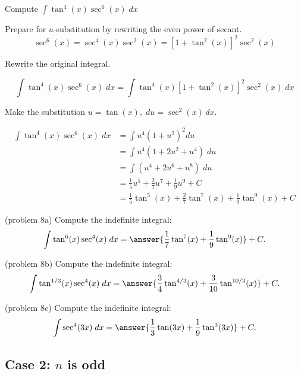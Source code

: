\documentclass{ximera}
\begin{document}
\begin{example}[example 8]
Compute $\displaystyle{\int \tan^4(x) \sec^6(x)\;dx}$

Prepare for $u$-substitution by rewriting the even power of secant.
\[
\sec^6(x) = \sec^4(x) \sec^2(x) = \left[1+\tan^2(x)\right]^2 \sec^2(x)
\]

Rewrite the original integral.

\[
\int \tan^4(x) \sec^6(x)\;dx = \int \tan^4(x) \left[1+\tan^2(x)\right]^2 \sec^2(x) \; dx
\]

Make the substitution $u = \tan(x), \; du = \sec^2(x) \, dx$.


\begin{align*}
\int \tan^4(x) \sec^6(x)\;dx &= \int u^4 (1+u^2)^2 du\\
&= \int u^4(1+2u^2 + u^4) \; du \\
&= \int (u^4 + 2u^6 + u^8) \; du \\
&=  \tfrac15 u^5 + \tfrac27 u^7 + \tfrac19 u^9 + C  \\
&= \tfrac15\tan^5(x)  + \tfrac27 \tan^7(x) + \tfrac19 \tan^9(x) + C
\end{align*}
\end{example} 



\begin{problem}(problem 8a)
Compute the indefinite integral:
\[
\int \tan^6(x) \sec^4(x)\;dx = \answer{\frac17 \tan^7(x) + \frac19 \tan^9(x)} + C.
\]
\end{problem}

\begin{problem}(problem 8b)
Compute the indefinite integral:
\[
\int \tan^{1/3}(x) \sec^4(x)\;dx = \answer{\frac34 \tan^{4/3}(x) + \frac{3}{10} \tan^{10/3}(x)} + C.
\]
\end{problem}

\begin{problem}(problem 8c)
Compute the indefinite integral:
\[
\int  \sec^4(3x)\;dx = \answer{\frac13 \tan(3x) + \frac19 \tan^3(3x)} + C.
\]
\end{problem}


\subsection{Case 2: $n$ is odd}
\end{document}
